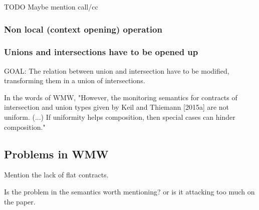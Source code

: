 TODO Maybe mention call/cc

\subsubsection{Non local (context opening) operation}

\subsubsection*{Unions and intersections have to be opened up}

GOAL: The relation between union and intersection have to be modified, transforming them
in a union of intersections.

In the words of WMW, "However, the monitoring semantics for contracts of intersection and union types given by Keil
and Thiemann [2015a] are not uniform. (...) If uniformity helps composition, then
special cases can hinder composition."

\subsection{Problems in WMW}

Mention the lack of flat contracts.

Is the problem in the semantics worth mentioning? or is it attacking too much on the paper.

